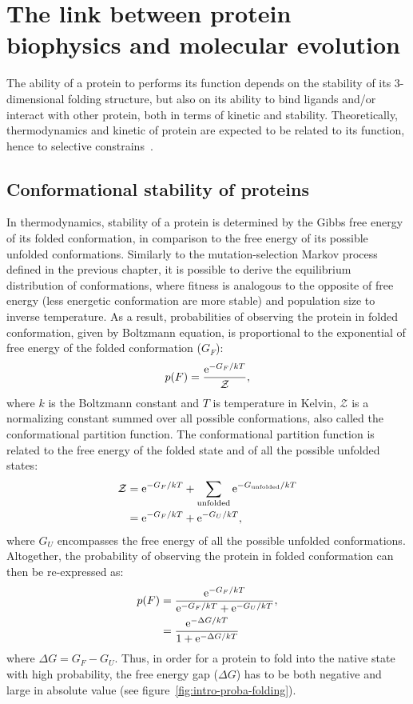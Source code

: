 \section{The link between protein biophysics and molecular evolution}
\label{sec:intro-protein-biophysics}

The ability of a protein to performs its function depends on the stability of its 3-dimensional folding structure, but also on its ability to bind ligands and/or interact with other protein, both in terms of kinetic and stability.
Theoretically, thermodynamics and kinetic of protein are expected to be related to its function, hence to selective constrains~\citep{Bastolla2017}.

\subsection{Conformational stability of proteins}

In thermodynamics, stability of a protein is determined by the Gibbs free energy of its folded conformation, in comparison to the free energy of its possible unfolded conformations.
Similarly to the mutation-selection Markov process defined in the previous chapter, it is possible to derive the equilibrium distribution of conformations, where fitness is analogous to the opposite of free energy (less energetic conformation are more stable) and population size to inverse temperature.
As a result, probabilities of observing the protein in folded conformation, given by Boltzmann equation, is proportional to the exponential of free energy of the folded conformation ($G_F$):
\begin{equation}
p(F) = \frac{\mathrm{e}^{-G_F / kT}}{\mathcal{Z}},
\end{equation}
where $k$ is the Boltzmann constant and $T$ is temperature in Kelvin, $\mathcal{Z}$ is a normalizing constant summed over all possible conformations, also called the conformational {partition function}.
The conformational partition function is related to the free energy of the folded state and of all the possible unfolded states:
\begin{align}
\mathcal{Z} & = \mathrm{e}^{-G_F / kT} + \sum\limits_{\text{unfolded}} \mathrm{e}^{-G_{\text{unfolded}} / kT} \\
            & = \mathrm{e}^{-G_F / kT} + \mathrm{e}^{-G_U / kT},
\end{align}
where $G_U$ encompasses the free energy of all the possible unfolded conformations.
Altogether, the probability of observing the protein in folded conformation can then be re-expressed as:
\begin{align}
p(F) & = \frac{\mathrm{e}^{-G_F / kT}}{\mathrm{e}^{-G_F / kT} + \mathrm{e}^{-G_U / kT}}, \\
     & = \frac{\mathrm{e}^{-\Delta G/kT}}{ 1 + \mathrm{e}^{-\Delta G/kT} }
\end{align}
where $\Delta G = G_F - G_U$.
Thus, in order for a protein to fold into the native state with high probability, the free energy gap ($\Delta G$) has to be both negative and large in absolute value (see figure~\ref{fig:intro-proba-folding}).

